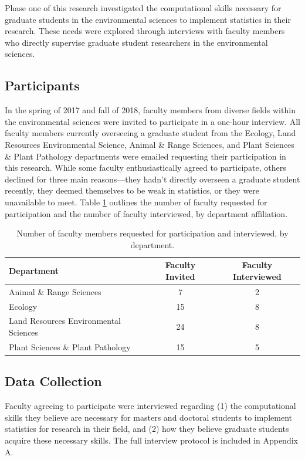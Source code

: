 \documentclass[12pt]{article}
\begin{document}
\quad Phase one of this research investigated the computational skills necessary
for graduate students in the environmental sciences to implement statistics in
their research. These needs were explored through interviews with faculty
members who directly supervise graduate student researchers in the environmental
sciences. 

\subsection{Participants}

\quad In the spring of 2017 and fall of 2018, faculty members from diverse 
fields within the environmental sciences were invited to participate in a 
one-hour interview. All faculty members currently overseeing a graduate student
from the Ecology, Land Resources Environmental Science, Animal \& Range 
Sciences, and Plant Sciences \& Plant Pathology departments were emailed 
requesting their participation in this research. While some faculty 
enthusiastically agreed to participate, others declined for three main 
reasons---they hadn't directly overseen a graduate student recently, they deemed
themselves to be weak in statistics, or they were unavailable to meet. Table 
\ref{tab:faculty} outlines the number of faculty requested for participation and
the number of faculty interviewed, by department affiliation. 

{
\begin{table}[h!]
\centering
\begin{tabular}{lcc}
\hline
Department & Faculty Invited & Faculty Interviewed  \\
\hline
Animal \& Range Sciences & 7 & 2 \\
Ecology & 15 & 8 \\
Land Resources Environmental Sciences & 24 & 8 \\
Plant Sciences \& Plant Pathology &  15 & 5 \\ 
\hline
\end{tabular}
\caption{Number of faculty members requested for participation and interviewed,
by department.}
\label{tab:faculty}
\end{table}
}

\subsection{Data Collection}  

\quad Faculty agreeing to participate were interviewed regarding (1) the 
computational skills they believe are necessary for masters and doctoral 
students to implement statistics for research in their field, and (2) how they 
believe graduate students acquire these necessary skills. The full interview 
protocol is included in Appendix A.  
\end{document}
